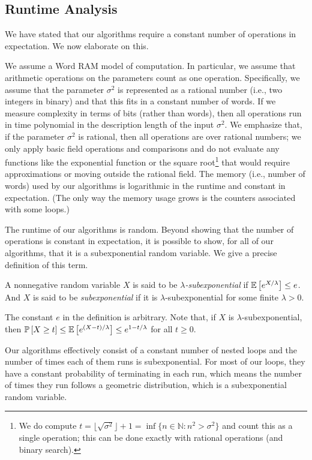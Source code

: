 \documentclass{jpcfinal} %
\newcommand{\ex}[2]{{\ifx&#1& \mathbb{E} \else
\underset{#1}{\mathbb{E}} \fi \left[#2\right]}}
\newcommand{\pr}[2]{{\ifx&#1& \mathbb{P} \else
\underset{#1}{\mathbb{P}} \fi \left[#2\right]}}
\begin{document}
\subsection{Runtime Analysis}
\label{ssec:runtime}
We have stated that our algorithms require a constant number of operations in expectation. We now elaborate on this.

We assume a Word RAM model of computation. In particular, we assume that arithmetic operations on the parameters count as one operation. Specifically, we assume that the parameter $\sigma^2$ is represented as a rational number (i.e., two integers in binary) and that this fits in a constant number of words. If we measure complexity in terms of bits (rather than words), then all operations run in time polynomial in the description length of the input $\sigma^2$. We emphasize that, if the parameter $\sigma^2$ is rational, then all operations are over rational numbers; we only apply basic field operations and comparisons and do not evaluate any functions like the exponential function or the square root\footnote{We do compute $t = \lfloor \sqrt{\sigma^2} \rfloor + 1 = \inf\{n \in \mathbb{N} : n^2>\sigma^2\}$ and count this as a single operation; this can be done exactly with rational operations (and binary search).} that would require approximations or moving outside the rational field. The memory (i.e., number of words) used by our algorithms is logarithmic in the runtime and constant in expectation. (The only way the memory usage grows is the counters associated with some loops.)

The runtime of our algorithms is random. Beyond showing that the number of operations is constant in expectation, it is possible to show, for all of our algorithms, that it is a subexponential random variable. We give a precise definition of this term.
\begin{defi}
A nonnegative random variable $X$ is said to be \emph{$\lambda$-subexponential} if $\ex{}{e^{X/\lambda}} \leq e$. And $X$ is said to be \emph{subexponential} if it is $\lambda$-subexponential for some finite $\lambda>0$. \end{defi}
The constant $e$ in the definition is arbitrary. Note that, if $X$ is $\lambda$-subexponential, then $\pr{}{X \ge t} \le \ex{}{e^{(X-t)/\lambda}} \le e^{1-t/\lambda}$ for all $t \ge 0$.

Our algorithms effectively consist of a constant number of nested loops and the number of times each of them runs is subexponential. For most of our loops, they have a constant probability of terminating in each run, which means the number of times they run follows a geometric distribution, which is a subexponential random variable. 
\end{document}
